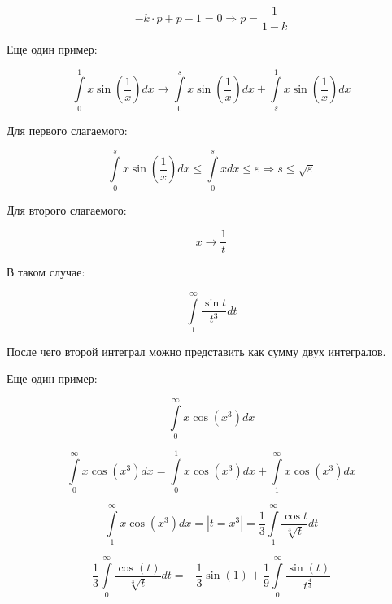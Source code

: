 \documentclass[10pt,a4paper]{article}
\begin{document}
	\begin{equation}
		-k\cdot p + p - 1 = 0 \Rightarrow p = \frac{1}{1 - k}
	\end{equation}
	
	Еще один пример:
	
	\begin{equation}
		\int\limits_{0}^{1}x\sin\left(\frac{1}{x}\right)dx \to
		\int\limits_{0}^{s}x\sin\left(\frac{1}{x}\right)dx + 
		\int\limits_{s}^{1}x\sin\left(\frac{1}{x}\right)dx
	\end{equation}
	
	Для первого слагаемого:
	
	\begin{equation}
		\int\limits_{0}^{s}x\sin\left(\frac{1}{x}\right)dx \leqslant
		\int\limits_{0}^{s}xdx \leqslant \varepsilon \Rightarrow s\leqslant
		\sqrt{\varepsilon}
	\end{equation}
	
	Для второго слагаемого:
	
	\begin{equation}
		x\to \frac{1}{t} 
	\end{equation}
	
	В таком случае:
	
	\begin{equation}
		\int\limits_{1}^{\infty}\frac{\sin t}{t^{3}}dt
	\end{equation}
	
	После чего второй интеграл можно представить как сумму двух интегралов.
	
	Еще один пример:
	
	\begin{equation}
		\int\limits_{0}^{\infty}x\cos\left(x^{3}\right)dx
	\end{equation}
	
	\begin{equation}
		\int\limits_{0}^{\infty}x\cos\left(x^{3}\right)dx = 
		\int\limits_{0}^{1}x\cos\left(x^{3}\right)dx +
		\int\limits_{1}^{\infty}x\cos\left(x^{3}\right)dx 
	\end{equation}
	
	\begin{equation}
		\int\limits_{1}^{\infty}x\cos\left(x^{3}\right)dx = \left|t = x^{3}
		\right| = 
		\frac{1}{3}\int\limits_{1}^{\infty}\frac{\cos t}{\sqrt[3]{t}}dt
	\end{equation}
	
	\begin{equation}
		\frac{1}{3}\int\limits_{0}^{\infty}\frac{\cos\left(t\right)}
		{\sqrt[3]{t}}dt = -\frac{1}{3}\sin\left(1\right) + \frac{1}{9}
		\int\limits_{0}^{\infty}\frac{\sin\left(t\right)}{t^{\frac{4}{3}}}
	\end{equation}
	
\end{document}
